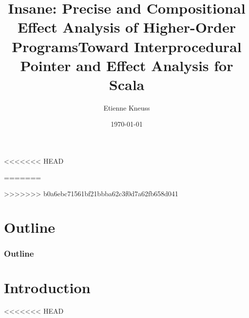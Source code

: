 \documentclass[hyperref={pdfpagelabels=false}]{beamer}
\begin{document}
<<<<<<< HEAD
\title{Insane: Precise and Compositional Effect Analysis of Higher-Order Programs}
=======
\title{Toward Interprocedural Pointer and Effect Analysis for Scala}
>>>>>>> b0a6ebc71561bf21bbba62c3f0d7a62fb658d041
\author{Etienne Kneuss}
\date{\today}

\nocite{*}


\begin{frame}
    \titlepage
\end{frame}

\section*{Outline}
\begin{frame}
    \frametitle{Outline}
    \tableofcontents
\end{frame}

\section{Introduction}
<<<<<<< HEAD
\end{document}
